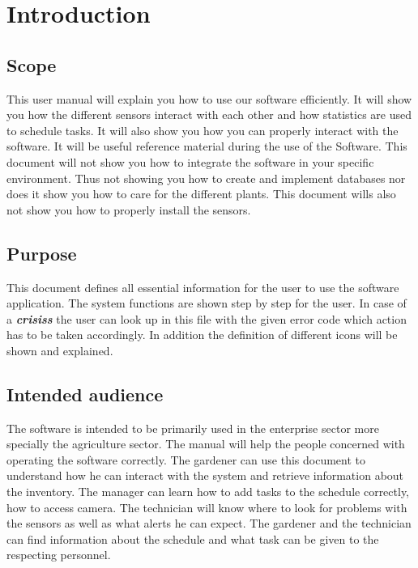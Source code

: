 \chapter{Introduction}
\label{chap:introduction}

\section{Scope}

This user manual will explain you how to use our software efficiently. It will
show you how the different sensors interact with each other and how statistics
are used to schedule tasks. It will also show you how you can properly interact
with the software. It will be useful reference material during the use of the
Software. This document will not show you how to integrate the software in your
specific environment. Thus not showing you how to create and implement databases
nor does it show you how to care for the different plants. This document wills
also not show you how to properly install the sensors.


\section{Purpose}

This document defines all essential information for the user to use the software application. 
The system functions are shown step by step for the user. In case of a
\textbf{\emph{\glspl{crisis}}} the user can look up in this file with the
given error code which action has to be taken accordingly.
In addition the definition of different icons will be shown and explained.





\section{Intended audience}

The software is intended to be primarily used in the enterprise sector more
specially the agriculture sector. The manual  will help the people concerned
with operating the software correctly. The gardener can use this document to
understand how he can interact with the system and retrieve information about
the inventory. The manager can learn how to add tasks to the schedule correctly,
how to access camera. The technician will know where to look for problems with
the sensors as well as what alerts he can expect. The gardener and the
technician can find information about the schedule and what task can be given to
the respecting personnel.

